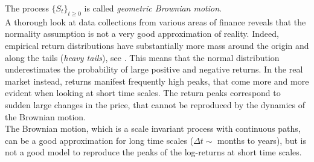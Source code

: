 The process $\{S_t\}_{t \geq0}$ is called \emph{geometric Brownian motion}.\\
A thorough look at data collections from various areas of finance reveals that the normality assumption 
is not a very good approximation of reality.
Indeed, empirical return distributions have substantially 
more mass around the origin and along the tails (\emph{heavy tails}), see \cite{Cont01}.
This means that the normal distribution underestimates the probability of large positive and negative returns. 
In the real market instead, returns manifest frequently high peaks, that come more and more evident when 
looking at short time scales.
The return peaks correspond to sudden large changes in the price, that cannot be reproduced by the dynamics of the Brownian motion.\\
The Brownian motion, which is a scale invariant process with continuous paths, can be a good approximation for long 
time scales ($\Delta t \sim$ months to years), but is not a good model to reproduce 
the peaks of the log-returns at short time scales.

